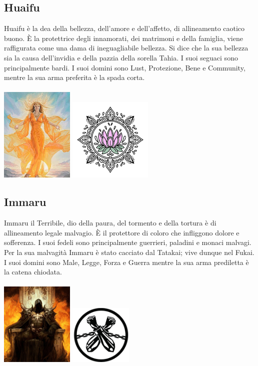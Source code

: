 \documentclass[10pt, a4paper]{report}
\begin{document}
\begin{multicols}{2}
\subsection*{Huaifu}
Huaifu è la dea della bellezza, dell'amore e dell'affetto, di allineamento caotico buono. È la protettrice degli innamorati, dei matrimoni e della famiglia, viene raffigurata come una dama di ineguagliabile bellezza. Si dice che la sua bellezza sia la causa dell'invidia e della pazzia della sorella Tahia. I suoi seguaci sono principalmente bardi. I suoi domini sono Lust, Protezione, Bene e Community, mentre la sua arma preferita è la spada corta.\\
\\
\includegraphics[width=3.5cm]{huaifu.jpeg}
\includegraphics[width=4cm]{huaifu_simbolo1.png}
\subsection*{Immaru}
Immaru il Terribile, dio della paura, del tormento e della tortura è di allineamento legale malvagio. È il protettore di coloro che infliggono dolore e sofferenza. I suoi fedeli sono principalmente guerrieri, paladini e monaci malvagi. Per la sua malvagità Immaru è stato cacciato dal Tatakai; vive dunque nel Fukai. I suoi domini sono Male, Legge, Forza e Guerra mentre la sua arma prediletta è la catena chiodata.\\
\\
\includegraphics[width = 3.5cm]{immaru.jpg}
\includegraphics[width = 3cm]{immaru_simbolo.jpg}\\

\end{multicols}
\end{document}
